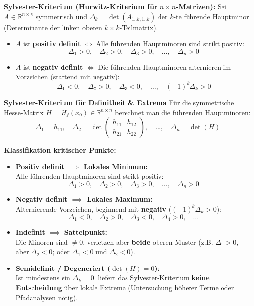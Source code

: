 \begin{theorem}
    \textbf{Sylvester-Kriterium (Hurwitz-Kriterium für $n \times n$-Matrizen):}
    Sei $A \in \mathbb{R}^{n \times n}$ symmetrisch und $\Delta_k = \det(A_{1..k, 1..k})$ der $k$-te führende Hauptminor (Determinante der linken oberen $k \times k$-Teilmatrix).
    \begin{itemize}
        \item $A$ ist \textbf{positiv definit} $\iff$ Alle führenden Hauptminoren sind strikt positiv:
        $$ \Delta_1 > 0, \quad \Delta_2 > 0, \quad \Delta_3 > 0, \quad \dots, \quad \Delta_n > 0 $$
        \item $A$ ist \textbf{negativ definit} $\iff$ Die führenden Hauptminoren alternieren im Vorzeichen (startend mit negativ):
        $$ \Delta_1 < 0, \quad \Delta_2 > 0, \quad \Delta_3 < 0, \quad \dots, \quad (-1)^k \Delta_k > 0 $$
    \end{itemize}
\end{theorem}

\begin{example}
    \textbf{Sylvester-Kriterium für Definitheit \& Extrema}
    Für die symmetrische Hesse-Matrix $H = H_f(x_0) \in \mathbb{R}^{n \times n}$ berechnet man die führenden Hauptminoren:
    $$ \Delta_1 = h_{11}, \quad \Delta_2 = \det\begin{pmatrix} h_{11} & h_{12} \\ h_{21} & h_{22} \end{pmatrix}, \quad \dots, \quad \Delta_n = \det(H) $$

    \textbf{Klassifikation kritischer Punkte:}
    \begin{itemize}
        \item \textbf{Positiv definit $\implies$ Lokales Minimum:} \\
        Alle führenden Hauptminoren sind strikt positiv:
        $$ \Delta_1 > 0, \quad \Delta_2 > 0, \quad \Delta_3 > 0, \quad \dots, \quad \Delta_n > 0 $$
        \item \textbf{Negativ definit $\implies$ Lokales Maximum:} \\
        Alternierende Vorzeichen, beginnend mit \textbf{negativ} ($(-1)^k \Delta_k > 0$):
        $$ \Delta_1 < 0, \quad \Delta_2 > 0, \quad \Delta_3 < 0, \quad \Delta_4 > 0, \quad \dots $$
        \item \textbf{Indefinit $\implies$ Sattelpunkt:} \\
        Die Minoren sind $\neq 0$, verletzen aber \textbf{beide} oberen Muster (z.B. $\Delta_1 > 0$, aber $\Delta_2 < 0$; oder $\Delta_1 < 0$ und $\Delta_2 < 0$).
        \item \textbf{Semidefinit / Degeneriert ($\det(H) = 0$):} \\
        Ist mindestens ein $\Delta_k = 0$, liefert das Sylvester-Kriterium \textbf{keine Entscheidung} über lokale Extrema (Untersuchung höherer Terme oder Pfadanalysen nötig).
    \end{itemize}
\end{example}

